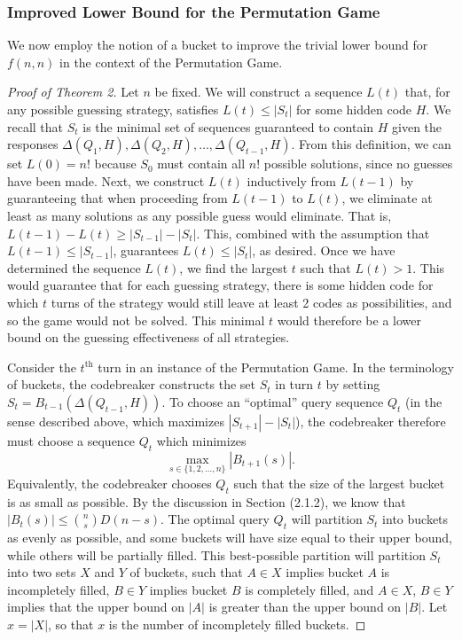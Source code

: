 \documentclass[12pt, a4paper]{article}
\newcommand{\nth}{^{\text{th}}}       %
\begin{document}
	\subsubsection{Improved Lower Bound for the Permutation Game}
	We now employ the notion of a bucket to improve the trivial lower bound for $f(n, n)$ in the context of the Permutation Game.
	\begin{proof}[Proof of Theorem 2]
		 Let $n$ be fixed. We will construct a sequence $L(t)$ that, for any possible guessing strategy, satisfies $L(t) \leq |S_t|$ for some hidden code $H$. We recall that $S_t$ is the minimal set of sequences guaranteed to contain $H$ given the responses $\Delta(Q_1, H), \Delta(Q_2, H), \ldots, \Delta(Q_{t-1}, H)$. From this definition, we can set $L(0) = n!$ because $S_0$ must contain all $n!$ possible solutions, since no guesses have been made. Next, we construct $L(t)$ inductively from $L(t-1)$ by guaranteeing that when proceeding from $L(t-1)$ to $L(t)$, we eliminate at least as many solutions as any possible guess would eliminate. That is, $L(t-1)-L(t) \geq |S_{t-1}| - |S_{t}|$. This, combined with the assumption that $L(t-1) \le |S_{t-1}|$, guarantees $L(t) \leq |S_t|$, as desired. Once we have determined the sequence $L(t)$, we find the largest $t$ such that $L(t) > 1$. This would guarantee that for each guessing strategy, there is some hidden code for which $t$ turns of the strategy would still leave at least 2 codes as possibilities, and so the game would not be solved. This minimal $t$ would therefore be a lower bound on the guessing effectiveness of all strategies. 
		 
		 Consider the $t\nth$ turn in an instance of the Permutation Game. In the terminology of buckets, the codebreaker constructs the set $S_t$ in turn $t$ by setting $S_t = B_{t-1}(\Delta(Q_{t-1}, H))$. To choose an ``optimal'' query sequence $Q_t$ (in the sense described above, which maximizes $|S_{t+1}| - |S_{t}|$), the codebreaker therefore must choose a sequence $Q_t$ which minimizes
		 \begin{equation*}
			\max_{s\in\{1,2,\ldots,n\}}|B_{t+1}(s)|.
		 \end{equation*}
		 Equivalently, the codebreaker chooses $Q_t$ such that the size of the largest bucket is as small as possible. By the discussion in Section (2.1.2), we know that $|B_t(s)|\le\binom{n}{s}D(n-s)$. The optimal query $Q_t$ will partition $S_t$ into buckets as evenly as possible, and some buckets will have size equal to their upper bound, while others will be partially filled. This best-possible partition will partition $S_t$ into two sets $X$ and $Y$ of buckets, such that $A\in X$ implies bucket $A$ is incompletely filled, $B\in Y$ implies bucket $B$ is completely filled, and $A\in X$, $B\in Y$ implies that the upper bound on $|A|$ is greater than the upper bound on $|B|$. Let $x = |X|$, so that $x$ is the number of incompletely filled buckets.
		 

\end{proof}
\end{document}
